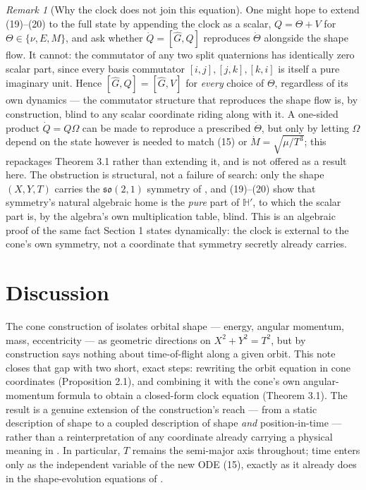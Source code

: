 \documentclass[12pt]{amsart}
\theoremstyle{plain}
\theoremstyle{remark}
\newtheorem*{remark}{Remark}
\begin{document}
\begin{remark}[Why the clock does not join this equation]
One might hope to extend (19)--(20) to the full state by appending the clock as a scalar, $Q=\Theta+V$ for $\Theta\in\{\nu,E,M\}$, and ask whether $\dot Q=[\hat G,Q]$ reproduces $\dot\Theta$ alongside the shape flow. It cannot: the commutator of any two split quaternions has identically zero scalar part, since every basis commutator $[i,j],[j,k],[k,i]$ is itself a pure imaginary unit. Hence $[\hat G,Q]=[\hat G,V]$ for \emph{every} choice of $\Theta$, regardless of its own dynamics --- the commutator structure that reproduces the shape flow is, by construction, blind to any scalar coordinate riding along with it. A one-sided product $\dot Q=Q\Omega$ can be made to reproduce a prescribed $\dot\Theta$, but only by letting $\Omega$ depend on the state however is needed to match (15) or $\dot M=\sqrt{\mu/T^3}$; this repackages Theorem 3.1 rather than extending it, and is not offered as a result here. The obstruction is structural, not a failure of search: only the shape $(X,Y,T)$ carries the $\mathfrak{so}(2,1)$ symmetry of \cite{Ebert2026Cone,Ebert2026EigenCoord}, and (19)--(20) show that symmetry's natural algebraic home is the \emph{pure} part of $\mathbb H'$, to which the scalar part is, by the algebra's own multiplication table, blind. This is an algebraic proof of the same fact Section 1 states dynamically: the clock is external to the cone's own symmetry, not a coordinate that symmetry secretly already carries.
\end{remark}

\section{Discussion}

The cone construction of \cite{Ebert2026Cone} isolates orbital shape --- energy, angular momentum, mass, eccentricity --- as geometric directions on $X^2+Y^2=T^2$, but by construction says nothing about time-of-flight along a given orbit. This note closes that gap with two short, exact steps: rewriting the orbit equation in cone coordinates (Proposition 2.1), and combining it with the cone's own angular-momentum formula to obtain a closed-form clock equation (Theorem 3.1). The result is a genuine extension of the construction's reach --- from a static description of shape to a coupled description of shape \emph{and} position-in-time --- rather than a reinterpretation of any coordinate already carrying a physical meaning in \cite{Ebert2026Cone}. In particular, $T$ remains the semi-major axis throughout; time enters only as the independent variable of the new ODE (15), exactly as it already does in the shape-evolution equations of \cite{Ebert2026Cone}.
\end{document}
